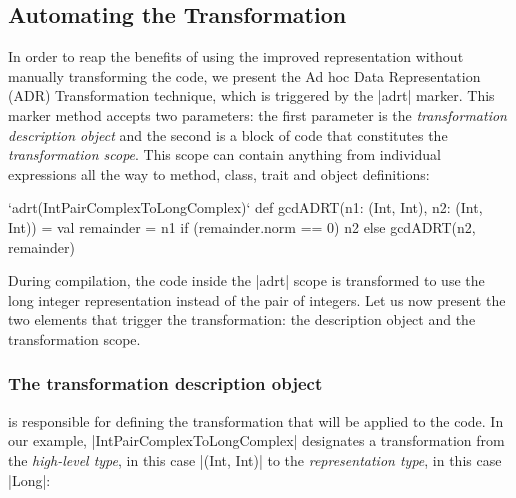 \subsection{Automating the Transformation}
\label{sec:automating}

In order to reap the benefits of using the improved representation
without manually transforming the code, we present the Ad hoc Data
Representation (ADR) Transformation technique, which is triggered
by the |adrt| marker. This marker method accepts two parameters: the
first parameter is the \emph{transformation description object} and the
second is a block of code that constitutes the \emph{transformation scope}. This
scope can contain anything from individual expressions all the way to method, class,
trait and object definitions:

\begin{lstlisting-nobreak}
`adrt(IntPairComplexToLongComplex)` {
  def gcdADRT(n1: (Int, Int), n2: (Int, Int)) = {
    val remainder = n1 %
    if (remainder.norm == 0) n2 else gcdADRT(n2, remainder)
  }
}
\end{lstlisting-nobreak}


During compilation, the code inside the |adrt| scope is transformed to use the long integer representation instead of the pair of integers. Let us now present the two elements that trigger the transformation: the  description object and the transformation scope.

\subsubsection{The transformation description object} is responsible for defining the transformation that will be applied to the code. In our example, |IntPairComplexToLongComplex| designates a transformation from the \emph{high-level type}, in this case |(Int, Int)| to the \emph{representation type}, in this case |Long|:

